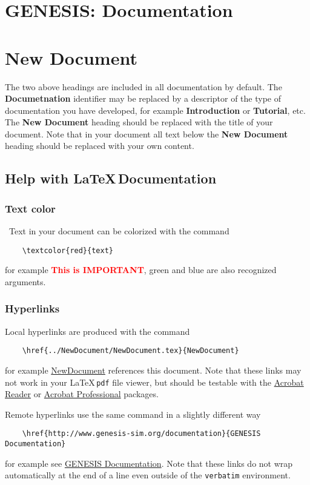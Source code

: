 \documentclass[12pt]{article}
\begin{document}
\section*{GENESIS: Documentation}

\section*{New Document}

The two above headings are included in all documentation by default. The {\bf Documetnation} identifier may be replaced by a descriptor of the type of documentation you have developed, for example {\bf Introduction} or {\bf Tutorial}, etc. The {\bf New Document} heading should be replaced with the title of your document. Note that in your document all text below the {\bf New Document} heading should be replaced with your own content.

\subsection*{Help with \LaTeX\,Documentation}

\subsubsection*{Text color}
\
Text in your document can be colorized  with the command
\begin{verbatim}
    \textcolor{red}{text}
\end{verbatim}
for example \textcolor{red}{\bf This is IMPORTANT}, green and blue are also recognized arguments.

\subsubsection*{Hyperlinks}

Local hyperlinks are produced with the command
\begin{verbatim}
    \href{../NewDocument/NewDocument.tex}{NewDocument}
\end{verbatim}
for example \href{../NewDocument/NewDocument.tex}{NewDocument} references this document.
Note that these links may not work in your \LaTeX\,{\tt pdf} file viewer, but should be testable with the \href{http://get.adobe.com/reader/}{Acrobat Reader} or \href{http://www.adobe.com/products/acrobatpro/tryout.html}{Acrobat Professional} packages.


Remote hyperlinks use the same command in a slightly different way
\begin{verbatim}
    \href{http://www.genesis-sim.org/documentation}{GENESIS Documentation}
\end{verbatim}
for example see \href{http://www.genesis-sim.org/documentation}{GENESIS Documentation}. Note that these links do not wrap automatically at the end of a line even outside of the {\tt verbatim} environment.
\end{document}
